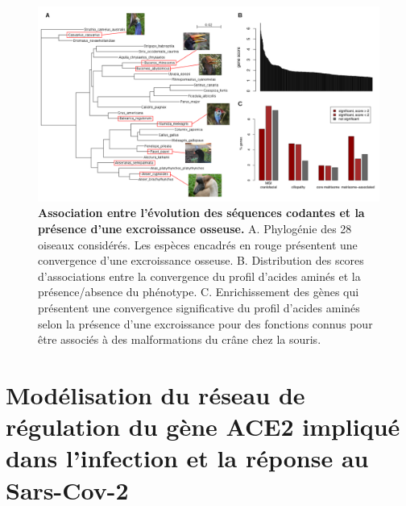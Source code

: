 \begin{figure}[h]
    \centering
    \includegraphics[width=1.2\textwidth, page=1] {figures/annexes/hocco-fig3.png}
    \caption[Association entre l'évolution des séquences codantes et la présence d'une excroissance osseuse.]{
    \textbf{Association entre l'évolution des séquences codantes et la présence d'une excroissance osseuse.}
    A. Phylogénie des 28 oiseaux considérés. Les espèces encadrés en rouge présentent une convergence d'une excroissance osseuse.
    B. Distribution des scores d'associations entre la convergence du profil d’acides aminés et la présence/absence du phénotype.
    C. Enrichissement des gènes qui présentent une convergence significative du profil d'acides aminés selon la présence d'une excroissance pour des fonctions connus pour être associés à des malformations du crâne chez la souris. \\
    }
    \label{fig:hocco-fig3}
\end{figure} 

\newpage
\section{Modélisation du réseau de régulation du gène ACE2 impliqué dans l’infection et la réponse au Sars-Cov-2}
\label{annexe:ACE2}

